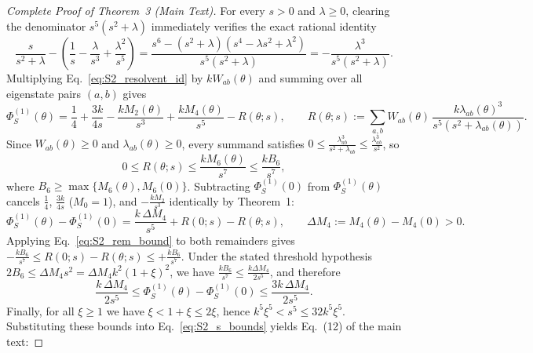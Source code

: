 \documentclass[onecolumn,10pt,notitlepage,amsmath,amssymb,floatfix]{revtex4-2}
\theoremstyle{plain}
\theoremstyle{definition}
\begin{document}
\begin{proof}[Complete Proof of Theorem~3 (Main Text)]
For every $s > 0$ and $\lambda \ge 0$, clearing the denominator $s^5(s^2+\lambda)$ immediately verifies the exact rational identity
\begin{equation}
\label{eq:S2_resolvent_id}
\frac{s}{s^2+\lambda} - \left(\frac{1}{s} - \frac{\lambda}{s^3} + \frac{\lambda^2}{s^5}\right)
= \frac{s^6 - (s^2+\lambda)(s^4 - \lambda s^2 + \lambda^2)}{s^5(s^2+\lambda)}
= -\frac{\lambda^3}{s^5(s^2+\lambda)}.
\end{equation}
Multiplying Eq.~\eqref{eq:S2_resolvent_id} by $k W_{ab}(\theta)$ and summing over all eigenstate pairs $(a,b)$ gives
\begin{equation}
\label{eq:S2_phi_expand}
\Phi_S^{(1)}(\theta) = \frac{1}{4} + \frac{3k}{4s} - \frac{k M_2(\theta)}{s^3} + \frac{k M_4(\theta)}{s^5} - R(\theta; s), \qquad
R(\theta; s) := \sum_{a,b} W_{ab}(\theta)\,\frac{k\lambda_{ab}(\theta)^3}{s^5(s^2+\lambda_{ab}(\theta))}.
\end{equation}
Since $W_{ab}(\theta) \ge 0$ and $\lambda_{ab}(\theta) \ge 0$, every summand satisfies $0 \le \frac{\lambda_{ab}^3}{s^2+\lambda_{ab}} \le \frac{\lambda_{ab}^3}{s^2}$, so
\begin{equation}
\label{eq:S2_rem_bound}
0 \le R(\theta; s) \le \frac{k M_6(\theta)}{s^7} \le \frac{k B_6}{s^7},
\end{equation}
where $B_6 \ge \max\{M_6(\theta), M_6(0)\}$. Subtracting $\Phi_S^{(1)}(0)$ from $\Phi_S^{(1)}(\theta)$ cancels $\frac{1}{4}$, $\frac{3k}{4s}$ ($M_0 = 1$), and $-\frac{k M_2}{s^3}$ identically by Theorem~1:
\begin{equation}
\label{eq:S2_diff}
\Phi_S^{(1)}(\theta) - \Phi_S^{(1)}(0) = \frac{k\,\Delta M_4}{s^5} + R(0; s) - R(\theta; s), \qquad \Delta M_4 := M_4(\theta) - M_4(0) > 0.
\end{equation}
Applying Eq.~\eqref{eq:S2_rem_bound} to both remainders gives $-\frac{k B_6}{s^7} \le R(0; s) - R(\theta; s) \le +\frac{k B_6}{s^7}$. Under the stated threshold hypothesis $2 B_6 \le \Delta M_4 s^2 = \Delta M_4 k^2(1+\xi)^2$, we have $\frac{k B_6}{s^7} \le \frac{k \Delta M_4}{2 s^5}$, and therefore
\begin{equation}
\label{eq:S2_s_bounds}
\frac{k\,\Delta M_4}{2 s^5} \le \Phi_S^{(1)}(\theta) - \Phi_S^{(1)}(0) \le \frac{3k\,\Delta M_4}{2 s^5}.
\end{equation}
Finally, for all $\xi \ge 1$ we have $\xi < 1+\xi \le 2\xi$, hence $k^5 \xi^5 < s^5 \le 32 k^5 \xi^5$. Substituting these bounds into Eq.~\eqref{eq:S2_s_bounds} yields Eq.~(12) of the main text:

\end{proof}
\end{document}
